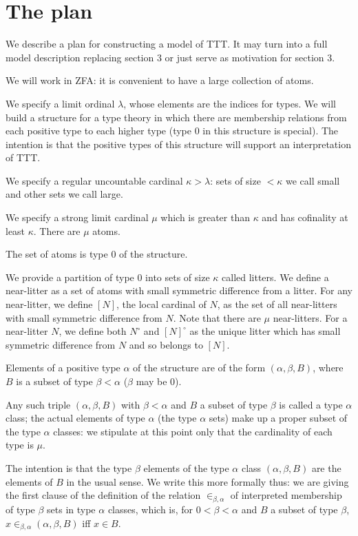 \documentclass[12pt]{article}
\begin{document}
\newpage

\section{The plan}

We describe a plan for constructing a model of TTT.  It may turn into a full model description replacing section 3 or just serve as motivation for section 3.

We will work in ZFA:  it is convenient to have a large collection of atoms.

We specify a limit ordinal $\lambda$, whose elements are the indices for types.  We will build a structure for a type theory in which there are membership relations from each positive type to each higher type (type 0 in this structure is special).  The intention is that the positive types of this structure will support an interpretation of TTT.

We specify a regular uncountable cardinal $\kappa>\lambda$:  sets of size $<\kappa$ we call small and other sets we call large.

We specify a strong limit cardinal $\mu$ which is greater than $\kappa$ and has cofinality at least $\kappa$.  There are $\mu$ atoms.

The set of atoms is type 0 of the structure.

We provide a partition of type 0 into sets of size $\kappa$ called litters.  We define a near-litter as a set of atoms with small symmetric difference from a litter.  For any near-litter, we define $[N]$, the local cardinal of $N$, as the set of all near-litters with small symmetric difference from $N$.  Note that there are $\mu$ near-litters.  For a near-litter $N$, we define both $N^\circ$ and $[N]^\circ$ as the unique litter which has small symmetric difference from $N$ and so belongs to $[N]$.

Elements of a positive type $\alpha$ of the structure are of the form $(\alpha,\beta,B)$, where $B$ is a subset of type $\beta<\alpha$ ($\beta$ may be 0).

Any such triple $(\alpha,\beta,B)$  with $\beta<\alpha$ and $B$ a subset of type $\beta$ is called a type $\alpha$ class;  the actual elements of type $\alpha$ (the type $\alpha$ sets) make up  a proper subset of the type $\alpha$ classes:  we stipulate at this point only that
the cardinality of each type is $\mu$.

The intention is that the type $\beta$ elements of the type $\alpha$ class $(\alpha,\beta,B)$ are the elements of $B$ in the usual sense.  We write this more formally
thus:  we are giving the first clause of the definition of the relation $\in_{\beta,\alpha}$ of interpreted membership of type $\beta$ sets in type $\alpha$ classes, which is, for $0<\beta<\alpha$ and $B$ a subset of type $\beta$,  $x \in_{\beta,\alpha} (\alpha,\beta,B)$ iff $x \in B$.
\end{document}

